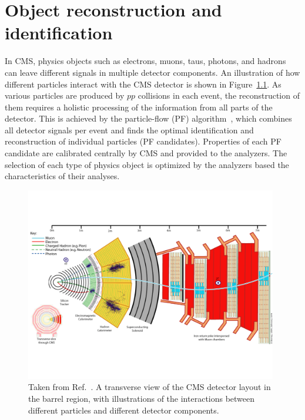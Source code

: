 \chapter{Object reconstruction and identification}\label{chp:objects}

In CMS, physics objects such as electrons, muons, taus, photons, and hadrons 
can leave different signals in multiple detector components.
An illustration of how different particles interact with the CMS detector is shown in Figure~\ref{fig:cms_interact}.
As various particles are produced by $pp$ collisions in each event, 
the reconstruction of them requires a holistic processing of the information from all parts of the detector. 
This is achieved by the particle-flow (PF) algorithm~\cite{Sirunyan_2017}, which combines all detector signals per event
and finds the optimal identification and reconstruction of individual particles (PF candidates).
Properties of each PF candidate are calibrated centrally by CMS and provided to the analyzers.
The selection of each type of physics object is optimized by the analyzers based the characteristics of their analyses.

\begin{figure}[!htb]
    \centering
    \captionsetup{justification=justified}
    \includegraphics[width=0.98\textwidth]{pics/object_reco/CMS Slice.pdf}
    \caption{Taken from Ref.~\cite{Davis:2205172}.
             A transverse view of the CMS detector layout in the barrel region,
             with illustrations of the interactions between different particles and different detector components.
             }
    \label{fig:cms_interact}
\end{figure}

